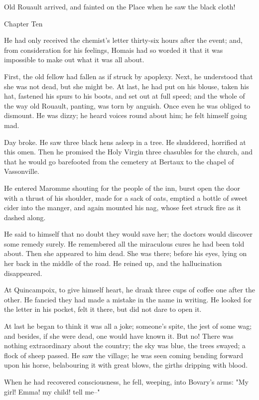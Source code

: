 \documentclass[11pt,twocolumn]{ltugboat}
\begin{document}
Old Rouault arrived, and fainted on the Place when he saw the black
cloth!



Chapter Ten

He had only received the chemist's letter thirty-six hours after the
event; and, from consideration for his feelings, Homais had so worded it
that it was impossible to make out what it was all about.

First, the old fellow had fallen as if struck by apoplexy. Next, he
understood that she was not dead, but she might be. At last, he had put
on his blouse, taken his hat, fastened his spurs to his boots, and set
out at full speed; and the whole of the way old Rouault, panting, was
torn by anguish. Once even he was obliged to dismount. He was dizzy; he
heard voices round about him; he felt himself going mad.

Day broke. He saw three black hens asleep in a tree. He shuddered,
horrified at this omen. Then he promised the Holy Virgin three chasubles
for the church, and that he would go barefooted from the cemetery at
Bertaux to the chapel of Vassonville.

He entered Maromme shouting for the people of the inn, burst open the
door with a thrust of his shoulder, made for a sack of oats, emptied a
bottle of sweet cider into the manger, and again mounted his nag, whose
feet struck fire as it dashed along.

He said to himself that no doubt they would save her; the doctors would
discover some remedy surely. He remembered all the miraculous cures
he had been told about. Then she appeared to him dead. She was there;
before his eyes, lying on her back in the middle of the road. He reined
up, and the hallucination disappeared.

At Quincampoix, to give himself heart, he drank three cups of coffee
one after the other. He fancied they had made a mistake in the name in
writing. He looked for the letter in his pocket, felt it there, but did
not dare to open it.

At last he began to think it was all a joke; someone's spite, the jest
of some wag; and besides, if she were dead, one would have known it. But
no! There was nothing extraordinary about the country; the sky was blue,
the trees swayed; a flock of sheep passed. He saw the village; he was
seen coming bending forward upon his horse, belabouring it with great
blows, the girths dripping with blood.

When he had recovered consciousness, he fell, weeping, into Bovary's
arms: "My girl! Emma! my child! tell me--"
\end{document}
